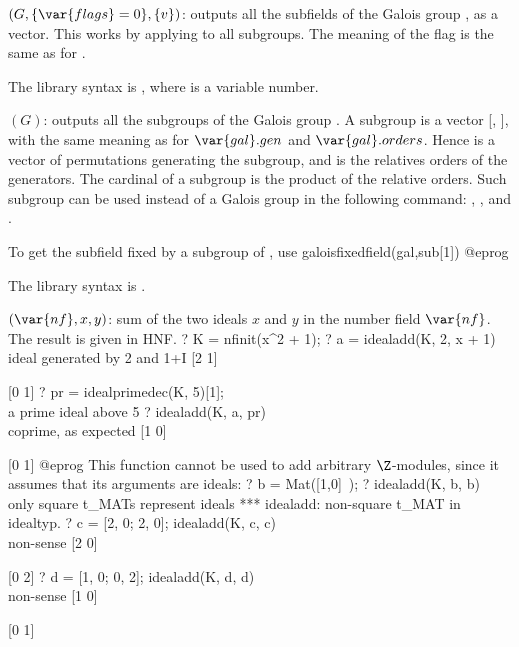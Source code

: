 $(G,\{\var{flags}=0\},\{v\})$: \label{se:galoissubfields}outputs all the subfields of the Galois group , as a vector.
This works by applying  to all subgroups. The meaning of
the flag  is the same as for .

The library syntax is , where  is a variable number.

$(G)$: \label{se:galoissubgroups}outputs all the subgroups of the Galois group . A subgroup is a
vector [, ], with the same meaning
as for $\var{gal}.gen$ and $\var{gal}.orders$. Hence  is a vector of
permutations generating the subgroup, and  is the relatives
orders of the generators. The cardinal of a subgroup is the product of the
relative orders. Such subgroup can be used instead of a Galois group in the
following command: , ,
 and .

To get the subfield fixed by a subgroup  of , use
\bprog
galoisfixedfield(gal,sub[1])
@eprog

The library syntax is .

$(\var{nf},x,y)$: \label{se:idealadd}sum of the two ideals $x$ and $y$ in the number field $\var{nf}$. The
result is given in HNF.
\bprog
 ? K = nfinit(x^2 + 1);
 ? a = idealadd(K, 2, x + 1)  \\ ideal generated by 2 and 1+I
 [2 1]

 [0 1]
 ? pr = idealprimedec(K, 5)[1];  \\ a prime ideal above 5
 ? idealadd(K, a, pr)     \\ coprime, as expected
 [1 0]

 [0 1]
@eprog\noindent
This function cannot be used to add arbitrary $\Z$-modules, since it assumes
that its arguments are ideals:
\bprog
  ? b = Mat([1,0]~);
  ? idealadd(K, b, b)     \\ only square t_MATs represent ideals
  *** idealadd: non-square t_MAT in idealtyp.
  ? c = [2, 0; 2, 0]; idealadd(K, c, c)   \\ non-sense
  [2 0]

  [0 2]
  ? d = [1, 0; 0, 2]; idealadd(K, d, d)   \\ non-sense
  [1 0]

  [0 1]

